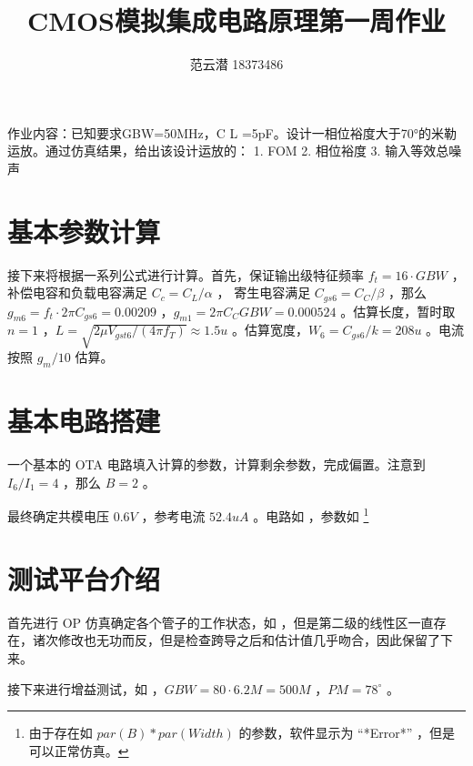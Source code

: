 \documentclass[lang=cn,11pt,a4paper,cite=authoryear]{elegantpaper}
\title{CMOS模拟集成电路原理\quad 第一周作业}
\author{范云潜 18373486}
\institute{微电子学院 184111 班}
\date{\zhtoday}
\begin{document}
\maketitle

作业内容：已知要求GBW=50MHz，C L =5pF。设计一相位裕度大于70°的米勒运放。通过仿真结果，给出该设计运放的：
1. FOM
2. 相位裕度
3. 输入等效总噪声

\tableofcontents

\listoffigures



\section{基本参数计算}

接下来将根据一系列公式进行计算。首先，保证输出级特征频率 \(f_t = 16 \cdot GBW\) ，补偿电容和负载电容满足 \(C_c = C_L / \alpha\) ， 寄生电容满足 \(C_{gs6} = C_C / \beta\) ，那么 \(g_{m6} = f_t \cdot 2 \pi C_{gs6} = 0.00209\) ，\(g_{m1} = 2 \pi C_C GBW = 0.000524\) 。估算长度，暂时取 \(n=1\) ，\(L = \sqrt{2 \mu V_{gst6} / (4 \pi f_T)} \approx 1.5 u\) 。估算宽度，\(W_6 = C_{gs6} / k = 208 u\) 。电流按照 \(g_m / 10\) 估算。

\section{基本电路搭建}

一个基本的 OTA 电路填入计算的参数，计算剩余参数，完成偏置。注意到 \(I_6/I_1 = 4\) ，那么 \(B = 2\) 。


最终确定共模电压 \(0.6V\) ，参考电流 \(52.4 uA\) 。电路如  ，参数如  \footnote{由于存在如 \(par(B)*par(Width)\) 的参数，软件显示为 “*Error*” ，但是可以正常仿真。}


\section{测试平台介绍}

首先进行 OP 仿真确定各个管子的工作状态，如  ，但是第二级的线性区一直存在，诸次修改也无功而反，但是检查跨导之后和估计值几乎吻合，因此保留了下来。


接下来进行增益测试，如  ，\(GBW = 80 \cdot 6.2 M = 500 M\) ，\(PM = 78^\circ\) 。
\end{document}
